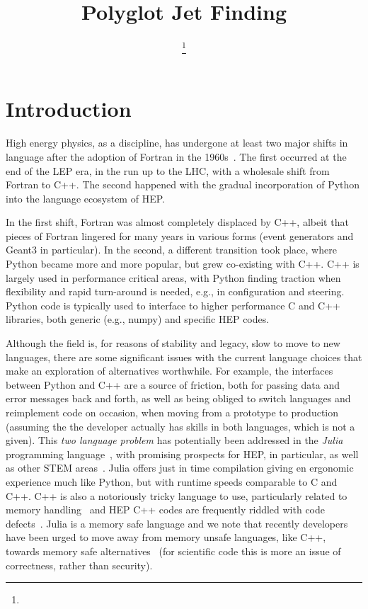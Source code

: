 \documentclass{webofc}
\title{Polyglot Jet Finding}
\author{\firstname{Graeme Andrew} \lastname{Stewart}\inst{1}\fnsep\thanks{\email{graeme.andrew.stewart@cern.ch}} \and
        \firstname{Philippe} \lastname{Gras}\inst{2}\fnsep \and
        \firstname{Benedikt} \lastname{Hegner}\inst{1}\fnsep \and
        \firstname{Atell} \lastname{Krasnopolski}\inst{3}
}
\institute{CERN, Esplanade des Particules 1, Geneva, Switzerland
\and
           IRFU, CEA, Université Paris-Saclay, Gif-sur-Yvette, France
\and
           Taras Shevchenko National University of Kyiv, Ukraine
          }
\begin{document}
\maketitle

\section{Introduction}
\label{sec:introduction}

High energy physics, as a discipline, has undergone at least two major shifts in
language after the adoption of Fortran in the 1960s~\cite{pivarski2022}. The
first occurred at the end of the LEP era, in the run up to the LHC, with a
wholesale shift from Fortran to C++. The second happened with the gradual
incorporation of Python into the language ecosystem of HEP.

In the first shift, Fortran was almost completely displaced by C++, albeit that
pieces of Fortran lingered for many years in various forms (event generators and
Geant3 in particular). In the second, a different transition took place, where
Python became more and more popular, but grew co-existing with C++. C++ is
largely used in performance critical areas, with Python finding traction when
flexibility and rapid turn-around is needed, e.g., in configuration and
steering. Python code is typically used to interface to higher performance C and
C++ libraries, both generic (e.g., numpy) and specific HEP codes.

Although the field is, for reasons of stability and legacy, slow to move to new
languages, there are some significant issues with the current language choices
that make an exploration of alternatives worthwhile. For example, the interfaces
between Python and C++ are a source of friction, both for passing data and error
messages back and forth, as well as being obliged to switch languages and
reimplement code on occasion, when moving from a prototype to production
(assuming the the developer actually has skills in both languages, which is not
a given). This \emph{two language problem} has potentially been addressed in the
\emph{Julia} programming
language~\cite{bib:julia_freshapproach,10.1145/3276490}, with promising
prospects for HEP, in particular, \cite{Stanitzki:2020bnx,eschle2023potential} as well as
other STEM areas~\cite{perkel-julia-science}. Julia offers just in time
compilation giving en ergonomic experience much like Python, but with runtime
speeds comparable to C and C++. C++ is also a notoriously tricky language to
use, particularly related to memory handling~\cite{ms-security-2019} and HEP C++
codes are frequently riddled with code defects~\cite{Naumann_2014}. Julia is
a memory safe language and we note that recently developers have been
urged to move away from memory unsafe languages, like C++, towards memory safe
alternatives~\cite{nsa-cybersecurity} (for scientific code this is more an
issue of correctness, rather than security).
\end{document}
